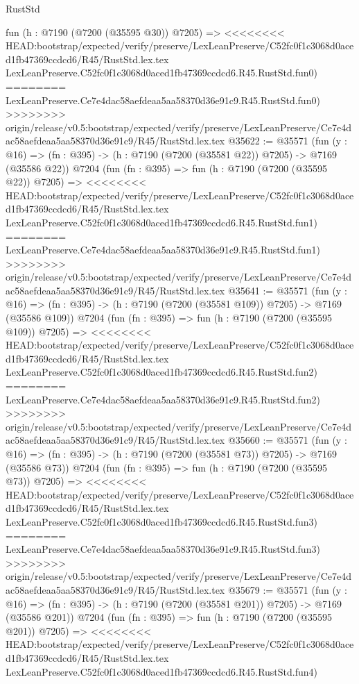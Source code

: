 \begin{lexlean}{RustStd}
\begin{coremodule}
{\begin{coremodule}
{{{{{{{{{{{{{{{{{{{{{{{{{{{{{{{{    fun (h : @7190 (@7200 (@35595 @30)) @7205) =>
<<<<<<<< HEAD:bootstrap/expected/verify/preserve/LexLeanPreserve/C52fc0f1c3068d0aced1fb47369ccdcd6/R45/RustStd.lex.tex
    LexLeanPreserve.C52fc0f1c3068d0aced1fb47369ccdcd6.R45.RustStd.fun0)
========
    LexLeanPreserve.Ce7e4dac58aefdeaa5aa58370d36e91c9.R45.RustStd.fun0)
>>>>>>>> origin/release/v0.5:bootstrap/expected/verify/preserve/LexLeanPreserve/Ce7e4dac58aefdeaa5aa58370d36e91c9/R45/RustStd.lex.tex
@35622 := @35571
    (fun (y : @16) => (fn : @395) -> (h : @7190 (@7200 (@35581 @22)) @7205) -> @7169 (@35586 @22))
    @7204
    (fun (fn : @395) =>
    fun (h : @7190 (@7200 (@35595 @22)) @7205) =>
<<<<<<<< HEAD:bootstrap/expected/verify/preserve/LexLeanPreserve/C52fc0f1c3068d0aced1fb47369ccdcd6/R45/RustStd.lex.tex
    LexLeanPreserve.C52fc0f1c3068d0aced1fb47369ccdcd6.R45.RustStd.fun1)
========
    LexLeanPreserve.Ce7e4dac58aefdeaa5aa58370d36e91c9.R45.RustStd.fun1)
>>>>>>>> origin/release/v0.5:bootstrap/expected/verify/preserve/LexLeanPreserve/Ce7e4dac58aefdeaa5aa58370d36e91c9/R45/RustStd.lex.tex
@35641 := @35571
    (fun (y : @16) => (fn : @395) -> (h : @7190 (@7200 (@35581 @109)) @7205) -> @7169 (@35586 @109))
    @7204
    (fun (fn : @395) =>
    fun (h : @7190 (@7200 (@35595 @109)) @7205) =>
<<<<<<<< HEAD:bootstrap/expected/verify/preserve/LexLeanPreserve/C52fc0f1c3068d0aced1fb47369ccdcd6/R45/RustStd.lex.tex
    LexLeanPreserve.C52fc0f1c3068d0aced1fb47369ccdcd6.R45.RustStd.fun2)
========
    LexLeanPreserve.Ce7e4dac58aefdeaa5aa58370d36e91c9.R45.RustStd.fun2)
>>>>>>>> origin/release/v0.5:bootstrap/expected/verify/preserve/LexLeanPreserve/Ce7e4dac58aefdeaa5aa58370d36e91c9/R45/RustStd.lex.tex
@35660 := @35571
    (fun (y : @16) => (fn : @395) -> (h : @7190 (@7200 (@35581 @73)) @7205) -> @7169 (@35586 @73))
    @7204
    (fun (fn : @395) =>
    fun (h : @7190 (@7200 (@35595 @73)) @7205) =>
<<<<<<<< HEAD:bootstrap/expected/verify/preserve/LexLeanPreserve/C52fc0f1c3068d0aced1fb47369ccdcd6/R45/RustStd.lex.tex
    LexLeanPreserve.C52fc0f1c3068d0aced1fb47369ccdcd6.R45.RustStd.fun3)
========
    LexLeanPreserve.Ce7e4dac58aefdeaa5aa58370d36e91c9.R45.RustStd.fun3)
>>>>>>>> origin/release/v0.5:bootstrap/expected/verify/preserve/LexLeanPreserve/Ce7e4dac58aefdeaa5aa58370d36e91c9/R45/RustStd.lex.tex
@35679 := @35571
    (fun (y : @16) => (fn : @395) -> (h : @7190 (@7200 (@35581 @201)) @7205) -> @7169 (@35586 @201))
    @7204
    (fun (fn : @395) =>
    fun (h : @7190 (@7200 (@35595 @201)) @7205) =>
<<<<<<<< HEAD:bootstrap/expected/verify/preserve/LexLeanPreserve/C52fc0f1c3068d0aced1fb47369ccdcd6/R45/RustStd.lex.tex
    LexLeanPreserve.C52fc0f1c3068d0aced1fb47369ccdcd6.R45.RustStd.fun4)
}}}}}}}}}}}}}}}}}}}}}}}}}}}}}}}}
\end{coremodule}}
\end{coremodule}
\end{lexlean}
